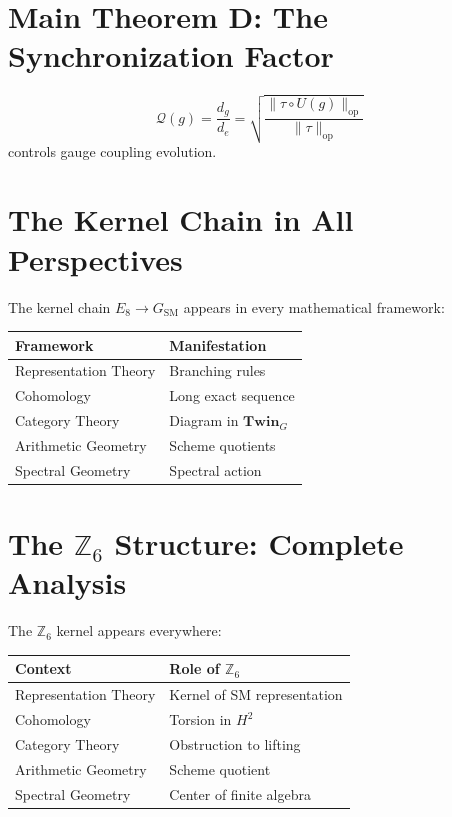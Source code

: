 \documentclass[11pt,a4paper,openright]{book}
\theoremstyle{plain}
\theoremstyle{definition}
\newcommand{\SM}{\mathrm{SM}}
\newcommand{\op}{\mathrm{op}}
\newcommand{\Z}{\mathbb{Z}}
\newcommand{\Twin}{\mathbf{Twin}}
\begin{document}
\section{Main Theorem D: The Synchronization Factor}

\begin{mainresult}[Synchronization]
\begin{equation}
\mathcal{Q}(g) = \frac{d_g}{d_e} = \sqrt{\frac{\|\tau \circ U(g)\|_{\op}}{\|\tau\|_{\op}}}
\end{equation}
controls gauge coupling evolution.
\end{mainresult}

\section{The Kernel Chain in All Perspectives}

The kernel chain $E_8 \to G_{\SM}$ appears in every mathematical framework:

\begin{center}
\begin{tabular}{ll}
\toprule
\textbf{Framework} & \textbf{Manifestation} \\
\midrule
Representation Theory & Branching rules \\
Cohomology & Long exact sequence \\
Category Theory & Diagram in $\Twin_G$ \\
Arithmetic Geometry & Scheme quotients \\
Spectral Geometry & Spectral action \\
\bottomrule
\end{tabular}
\end{center}

\section{The $\Z_6$ Structure: Complete Analysis}

The $\Z_6$ kernel appears everywhere:

\begin{center}
\begin{tabular}{ll}
\toprule
\textbf{Context} & \textbf{Role of $\Z_6$} \\
\midrule
Representation Theory & Kernel of SM representation \\
Cohomology & Torsion in $H^2$ \\
Category Theory & Obstruction to lifting \\
Arithmetic Geometry & Scheme quotient \\
Spectral Geometry & Center of finite algebra \\
\bottomrule
\end{tabular}
\end{center}
\end{document}
